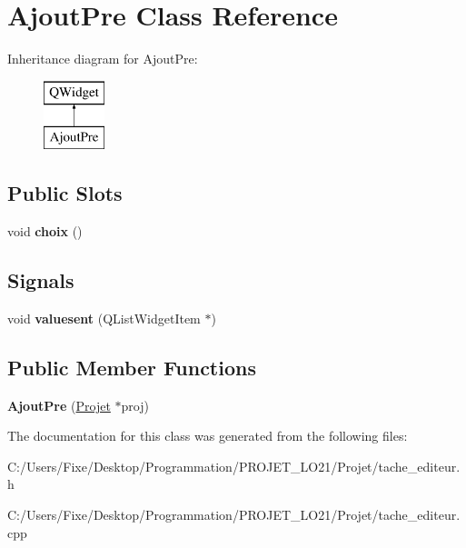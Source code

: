 \hypertarget{class_ajout_pre}{}\section{Ajout\+Pre Class Reference}
\label{class_ajout_pre}
Inheritance diagram for Ajout\+Pre\+:\begin{figure}[H]
\begin{center}
\leavevmode
\includegraphics[height=2.000000cm]{class_ajout_pre}
\end{center}
\end{figure}
\subsection*{Public Slots}
\begin{DoxyCompactItemize}
\item 
\hypertarget{class_ajout_pre_a35c2b96edbb56e786c0191f287a31548}{}void {\bfseries choix} ()\label{class_ajout_pre_a35c2b96edbb56e786c0191f287a31548}

\end{DoxyCompactItemize}
\subsection*{Signals}
\begin{DoxyCompactItemize}
\item 
\hypertarget{class_ajout_pre_ab6c44dadc22e31874fbee266db7b30ca}{}void {\bfseries valuesent} (Q\+List\+Widget\+Item $\ast$)\label{class_ajout_pre_ab6c44dadc22e31874fbee266db7b30ca}

\end{DoxyCompactItemize}
\subsection*{Public Member Functions}
\begin{DoxyCompactItemize}
\item 
\hypertarget{class_ajout_pre_affdb806a68115c606c4eb702b85d6489}{}{\bfseries Ajout\+Pre} (\hyperlink{class_projet}{Projet} $\ast$proj)\label{class_ajout_pre_affdb806a68115c606c4eb702b85d6489}

\end{DoxyCompactItemize}


The documentation for this class was generated from the following files\+:\begin{DoxyCompactItemize}
\item 
C\+:/\+Users/\+Fixe/\+Desktop/\+Programmation/\+P\+R\+O\+J\+E\+T\+\_\+\+L\+O21/\+Projet/tache\+\_\+editeur.\+h\item 
C\+:/\+Users/\+Fixe/\+Desktop/\+Programmation/\+P\+R\+O\+J\+E\+T\+\_\+\+L\+O21/\+Projet/tache\+\_\+editeur.\+cpp\end{DoxyCompactItemize}
